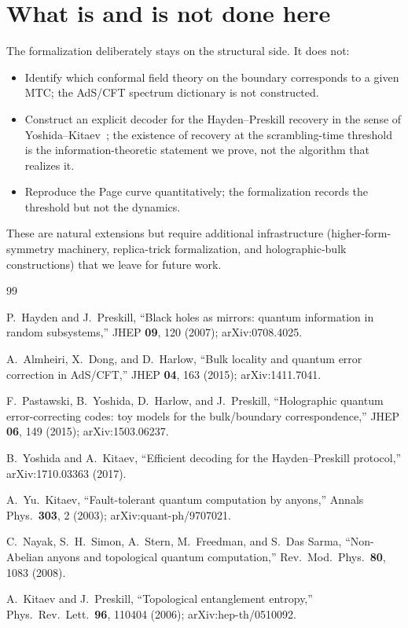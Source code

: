 \documentclass[twocolumn]{revtex4-2}
\begin{document}
\section{What is and is not done here}
\label{sec:scope}

The formalization deliberately stays on the structural side. It
does not:

\begin{itemize}
\item Identify which conformal field theory on the boundary
corresponds to a given MTC; the AdS/CFT spectrum dictionary is not
constructed.
\item Construct an explicit decoder for the Hayden--Preskill recovery
in the sense of Yoshida--Kitaev~\cite{YoshidaKitaev2017}; the
existence of recovery at the scrambling-time threshold is the
information-theoretic statement we prove, not the algorithm that
realizes it.
\item Reproduce the Page curve quantitatively; the formalization
records the threshold but not the dynamics.
\end{itemize}

These are natural extensions but require additional infrastructure
(higher-form-symmetry machinery, replica-trick formalization, and
holographic-bulk constructions) that we leave for future work.

\begin{thebibliography}{99}

P.~Hayden and J.~Preskill,
``Black holes as mirrors: quantum information in random subsystems,''
JHEP \textbf{09}, 120 (2007); arXiv:0708.4025.

A.~Almheiri, X.~Dong, and D.~Harlow,
``Bulk locality and quantum error correction in AdS/CFT,''
JHEP \textbf{04}, 163 (2015); arXiv:1411.7041.

F.~Pastawski, B.~Yoshida, D.~Harlow, and J.~Preskill,
``Holographic quantum error-correcting codes: toy models for the
bulk/boundary correspondence,''
JHEP \textbf{06}, 149 (2015); arXiv:1503.06237.

B.~Yoshida and A.~Kitaev,
``Efficient decoding for the Hayden--Preskill protocol,''
arXiv:1710.03363 (2017).

A.~Yu.~Kitaev,
``Fault-tolerant quantum computation by anyons,''
Annals Phys.\ \textbf{303}, 2 (2003); arXiv:quant-ph/9707021.

C.~Nayak, S.~H.~Simon, A.~Stern, M.~Freedman, and S.~Das Sarma,
``Non-Abelian anyons and topological quantum computation,''
Rev.\ Mod.\ Phys.\ \textbf{80}, 1083 (2008).

A.~Kitaev and J.~Preskill,
``Topological entanglement entropy,''
Phys.\ Rev.\ Lett.\ \textbf{96}, 110404 (2006);
arXiv:hep-th/0510092.

\end{thebibliography}
\end{document}
